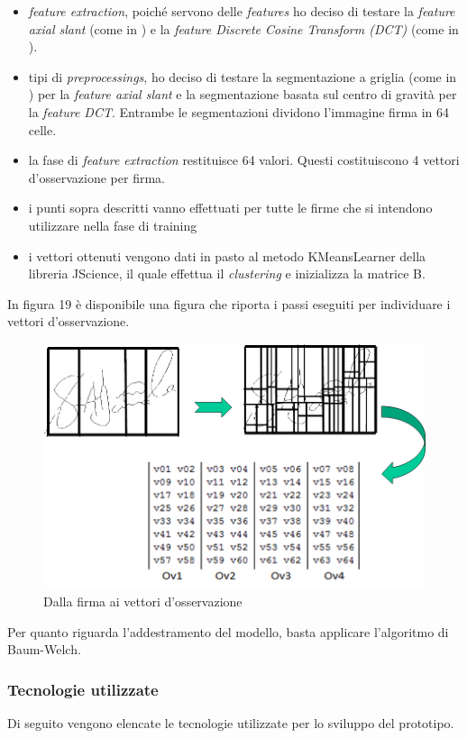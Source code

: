 \begin{itemize}
\item \emph{feature extraction}, poiché servono delle \emph{features} ho deciso di testare la \emph{feature axial slant} (come in \cite{3}) e la \emph{feature Discrete Cosine Transform (DCT)} (come in \cite{5}).
\item tipi di \emph{preprocessings}, ho deciso di testare la segmentazione a griglia (come in \cite{3}) per la \emph{feature axial slant} e la segmentazione basata sul centro di gravità per la \emph{feature DCT}\cite{5}. Entrambe le segmentazioni dividono l'immagine firma in 64 celle.
\item la fase di \emph{feature extraction} restituisce 64 valori. Questi costituiscono 4 vettori d'osservazione per firma.
\item i punti sopra descritti vanno effettuati per tutte le firme che si intendono utilizzare nella fase di training
\item i vettori ottenuti vengono dati in pasto al metodo KMeansLearner della libreria JScience, il quale effettua il \emph{clustering} e inizializza la matrice B.
\end{itemize}
In figura 19 è disponibile una figura che riporta i passi eseguiti per individuare i  vettori d'osservazione.
\begin{figure}[H]
\centering
\includegraphics[scale=0.6]{../capitolo3img/matriceB.png}
\caption{Dalla firma ai vettori d'osservazione}
\end{figure}
Per quanto riguarda l'addestramento del modello, basta applicare l'algoritmo di Baum-Welch.

\subsubsection{Tecnologie utilizzate}
\label{3.3.3}
Di seguito vengono elencate le tecnologie utilizzate per lo sviluppo del prototipo.

